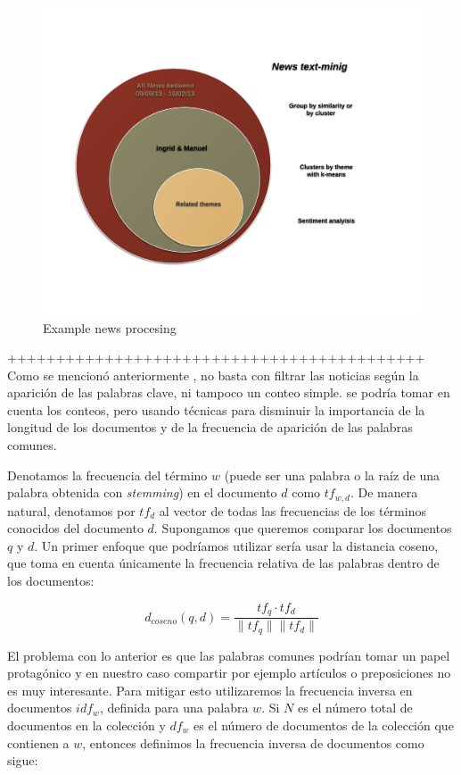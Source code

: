 \documentclass[]{article}
\begin{document}
\begin{figure}[htbp]
\centering
\includegraphics{img/news.png}
\caption{Example news procesing}
\end{figure}

+++++++++++++++++++++++++++++++++++++++++++ Como se mencionó
anteriormente , no basta con filtrar las noticias según la aparición de
las palabras clave, ni tampoco un conteo simple. se podría tomar en
cuenta los conteos, pero usando técnicas para disminuir la importancia
de la longitud de los documentos y de la frecuencia de aparición de las
palabras comunes.

Denotamos la frecuencia del término $w$ (puede ser una palabra o la raíz
de una palabra obtenida con \emph{stemming}) en el documento $d$ como
$tf_{w,d}$. De manera natural, denotamos por $tf_d$ al vector de todas
las frecuencias de los términos conocidos del documento $d$. Supongamos
que queremos comparar los documentos $q$ y $d$. Un primer enfoque que
podríamos utilizar sería usar la distancia coseno, que toma en cuenta
únicamente la frecuencia relativa de las palabras dentro de los
documentos:

\[
d_{coseno}(q,d) = \frac{tf_q \cdot tf_d}{\|tf_q\| \|tf_d\|}
\]

El problema con lo anterior es que las palabras comunes podrían tomar un
papel protagónico y en nuestro caso compartir por ejemplo artículos o
preposiciones no es muy interesante. Para mitigar esto utilizaremos la
frecuencia inversa en documentos $idf_w$, definida para una palabra $w$.
Si $N$ es el número total de documentos en la colección y $df_w$ es el
número de documentos de la colección que contienen a $w$, entonces
definimos la frecuencia inversa de documentos como sigue:
\end{document}

